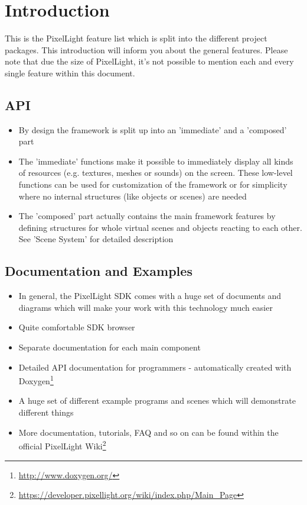 \chapter{Introduction}
This is the PixelLight feature list which is split into the different project packages. This introduction will inform you about the general features. Please note that due the size of PixelLight, it's not possible to mention each and every single feature within this document.





\section{\ac{API}}
\begin{itemize}
\item{By design the framework is split up into an 'immediate' and a 'composed' part}
\item{The 'immediate' functions make it possible to immediately display all kinds of resources (e.g. textures, meshes or sounds) on the screen. These low-level functions can be used for customization of the framework or for simplicity where no internal structures (like objects or scenes) are needed}
\item{The 'composed' part actually contains the main framework features by defining structures for whole virtual scenes and objects reacting to each other. See 'Scene System' for detailed description}
\end{itemize}





\section{Documentation and Examples}
\begin{itemize}
\item{In general, the PixelLight \ac{SDK} comes with a huge set of documents and diagrams which will make your work with this technology much easier}
\item{Quite comfortable \ac{SDK} browser}
\item{Separate documentation for each main component}
\item{Detailed \ac{API} documentation for programmers - automatically created with Doxygen\footnote{\url{http://www.doxygen.org/}}}
\item{A huge set of different example programs and scenes which will demonstrate different things}
\item{More documentation, tutorials, \ac{FAQ} and so on can be found within the official PixelLight Wiki\footnote{\url{https://developer.pixellight.org/wiki/index.php/Main_Page}}}
\end{itemize}





